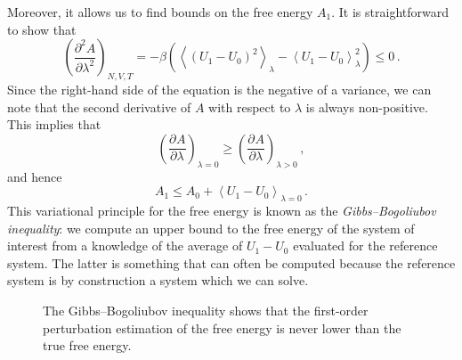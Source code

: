 \documentclass{article}
\theoremstyle{plain}\theoremheaderfont{\normalfont\bfseries}\theorembodyfont{\rmfamily}\theoremseparator{.}\newtheorem*{thm}{Theorem}\newtheorem*{law}{Law}\newtheorem*{pos}{Postulate}
\numberwithin{equation}{section}
\newcommand{\pdv}[3][]{\frac{\partial^{#1} #2}{{\partial #3}^{#1}}}
\newcommand{\eval}[1]{\left\langle #1 \right\rangle}
\begin{document}
    Moreover, it allows us to find bounds on the free energy \(A_1\). It is straightforward to show that
    \begin{equation}
        \left(\pdv[2]{A}{\lambda}\right)_{N,V,T}=-\beta\left(\eval{(U_1-U_0)^2}_\lambda-\eval{U_1-U_0}_\lambda^2\right)\le 0\,.
    \end{equation}
    Since the right-hand side of the equation is the negative of a variance, we can note that the second derivative of \(A\) with respect to \(\lambda\) is always non-positive. This implies that
    \begin{equation}
        \left(\pdv{A}{\lambda}\right)_{\lambda=0}\ge\left(\pdv{A}{\lambda}\right)_{\lambda>0}\,,
    \end{equation}
    and hence
    \begin{equation}\label{Gibbs_Bogoliubov}
        A_1\le A_0+\eval{U_1-U_0}_{\lambda=0}\,.
    \end{equation}
    This variational principle for the free energy is known as the \textit{Gibbs--Bogoliubov inequality}: we compute an upper bound to the free energy of the system of interest from a knowledge of the average of \(U_1-U_0\) evaluated for the reference system. The latter is something that can often be computed because the reference system is by construction a system which we can solve.

    \begin{figure}[ht!]
        \centering
        \caption{The Gibbs--Bogoliubov inequality shows that the first-order perturbation estimation of the free energy is never lower than the true free energy.}
    \end{figure}
\end{document}
